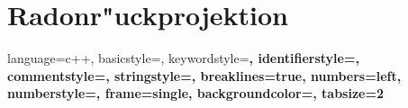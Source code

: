 \chapter{Radonr"uckprojektion}
\begin{refsection}
{
	
	\lstset
	{
		language=c++,
		basicstyle=\scriptsize\ttfamily,
		keywordstyle=\color{red}\bfseries,
		identifierstyle=\color{blue},
		commentstyle=\color{radon_Green},
		stringstyle=\ttfamily,
		breaklines=true,
		numbers=left,
		numberstyle=\tiny,
		frame=single,
		backgroundcolor=\color{radon_Grey},
		tabsize=2
	}
	

	
			
		
			
			
	
			

\printbibliography[heading=subbibliography]

}
\end{refsection}

